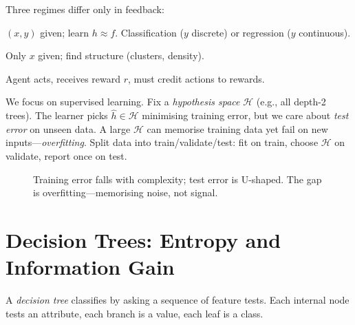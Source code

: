 Three regimes differ only in feedback:
\begin{description}[leftmargin=1.2em, itemsep=0.3em]
    \item[Supervised] $(x,y)$ given; learn $h\approx f$. Classification ($y$ discrete) or regression ($y$ continuous).
    \item[Unsupervised] Only $x$ given; find structure (clusters, density).
    \item[Reinforcement] Agent acts, receives reward $r$, must credit actions to rewards.
\end{description}
We focus on supervised learning. Fix a \emph{hypothesis space} $\mathcal{H}$ (e.g., all depth-2 trees). The learner picks $\hat h\in\mathcal{H}$ minimising training error, but we care about \emph{test error} on unseen data. A large $\mathcal{H}$ can memorise training data yet fail on new inputs---\emph{overfitting}. Split data into train/validate/test: fit on train, choose $\mathcal{H}$ on validate, report once on test.

\begin{figure}[h!]
\centering
{}
\caption{Training error falls with complexity; test error is U-shaped. The gap is overfitting---memorising noise, not signal.}
\label{fig:overfitting}
\end{figure}

\section{Decision Trees: Entropy and Information Gain}
\label{sec:decision-trees}
A \emph{decision tree} classifies by asking a sequence of feature tests. Each internal node tests an attribute, each branch is a value, each leaf is a class.

